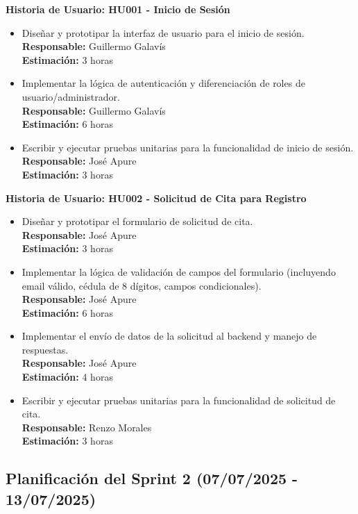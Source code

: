 \documentclass[12pt]{article}
\begin{document}
\textbf{Historia de Usuario: HU001 - Inicio de Sesión}
\begin{itemize}
	\item Diseñar y prototipar la interfaz de usuario para el inicio de sesión. \\
	\textbf{Responsable:} Guillermo Galavís \\
	\textbf{Estimación:} 3 horas
	\item Implementar la lógica de autenticación y diferenciación de roles de usuario/administrador. \\
	\textbf{Responsable:} Guillermo Galavís \\
	\textbf{Estimación:} 6 horas
	\item Escribir y ejecutar pruebas unitarias para la funcionalidad de inicio de sesión. \\
	\textbf{Responsable:} José Apure \\
	\textbf{Estimación:} 3 horas
\end{itemize}

\textbf{Historia de Usuario: HU002 - Solicitud de Cita para Registro}
\begin{itemize}
	\item Diseñar y prototipar el formulario de solicitud de cita. \\
	\textbf{Responsable:} José Apure \\
	\textbf{Estimación:} 3 horas
	\item Implementar la lógica de validación de campos del formulario (incluyendo email válido, cédula de 8 dígitos, campos condicionales). \\
	\textbf{Responsable:} José Apure \\
	\textbf{Estimación:} 6 horas
	\item Implementar el envío de datos de la solicitud al backend y manejo de respuestas. \\
	\textbf{Responsable:} José Apure \\
	\textbf{Estimación:} 4 horas
	\item Escribir y ejecutar pruebas unitarias para la funcionalidad de solicitud de cita. \\
	\textbf{Responsable:} Renzo Morales \\
	\textbf{Estimación:} 3 horas
\end{itemize}

\pagebreak

\subsection{Planificación del Sprint 2 (07/07/2025 - 13/07/2025)}
\end{document}
